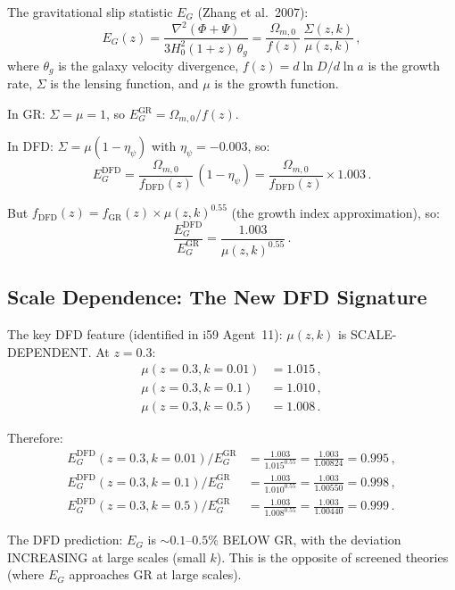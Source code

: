 \documentclass[11pt,a4paper]{article}
\begin{document}
The gravitational slip statistic $E_G$ (Zhang et al.\ 2007):
\begin{equation}
E_G(z) = \frac{\nabla^2(\Phi + \Psi)}{3H_0^2(1+z)\,\theta_g} = \frac{\Omega_{m,0}}{f(z)}\,\frac{\Sigma(z,k)}{\mu(z,k)}\,,
\end{equation}
where $\theta_g$ is the galaxy velocity divergence, $f(z) = d\ln D/d\ln a$ is the growth rate, $\Sigma$ is the lensing function, and $\mu$ is the growth function.

In GR: $\Sigma = \mu = 1$, so $E_G^{\mathrm{GR}} = \Omega_{m,0}/f(z)$.

In DFD: $\Sigma = \mu(1-\eta_\psi)$ with $\eta_\psi = -0.003$, so:
\begin{equation}
E_G^{\mathrm{DFD}} = \frac{\Omega_{m,0}}{f_{\mathrm{DFD}}(z)}\,(1 - \eta_\psi) = \frac{\Omega_{m,0}}{f_{\mathrm{DFD}}(z)}\times 1.003\,.
\end{equation}

But $f_{\mathrm{DFD}}(z) = f_{\mathrm{GR}}(z)\times\mu(z,k)^{0.55}$ (the growth index approximation), so:
\begin{equation}
\frac{E_G^{\mathrm{DFD}}}{E_G^{\mathrm{GR}}} = \frac{1.003}{\mu(z,k)^{0.55}}\,.
\end{equation}

\subsection{Scale Dependence: The New DFD Signature}

The key DFD feature (identified in i59 Agent~11): $\mu(z,k)$ is SCALE-DEPENDENT. At $z = 0.3$:
\begin{align}
\mu(z=0.3, k = 0.01) &= 1.015\,, \\
\mu(z=0.3, k = 0.1) &= 1.010\,, \\
\mu(z=0.3, k = 0.5) &= 1.008\,.
\end{align}

Therefore:
\begin{align}
E_G^{\mathrm{DFD}}(z=0.3, k=0.01)/E_G^{\mathrm{GR}} &= \frac{1.003}{1.015^{0.55}} = \frac{1.003}{1.00824} = 0.995\,, \\
E_G^{\mathrm{DFD}}(z=0.3, k=0.1)/E_G^{\mathrm{GR}} &= \frac{1.003}{1.010^{0.55}} = \frac{1.003}{1.00550} = 0.998\,, \\
E_G^{\mathrm{DFD}}(z=0.3, k=0.5)/E_G^{\mathrm{GR}} &= \frac{1.003}{1.008^{0.55}} = \frac{1.003}{1.00440} = 0.999\,.
\end{align}

The DFD prediction: $E_G$ is $\sim 0.1$--$0.5\%$ BELOW GR, with the deviation INCREASING at large scales (small $k$). This is the opposite of screened theories (where $E_G$ approaches GR at large scales).
\end{document}
